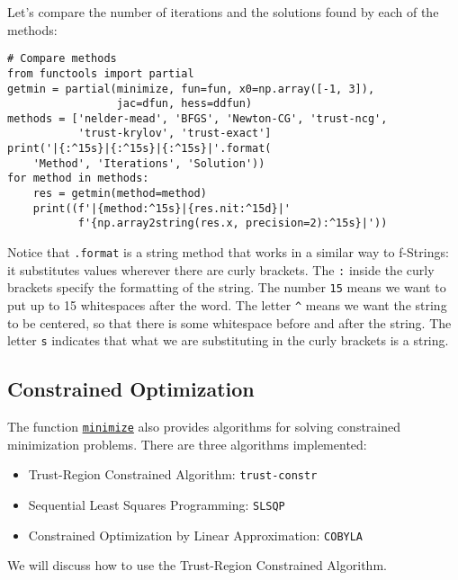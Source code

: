 \documentclass[12pt, a4paper]{article}
\begin{document}
Let's compare the number of iterations and the solutions found by each of the methods:
\lstset{language=jupyter-python,label= ,caption= ,captionpos=b,numbers=none}
\begin{lstlisting}
# Compare methods
from functools import partial
getmin = partial(minimize, fun=fun, x0=np.array([-1, 3]),
                 jac=dfun, hess=ddfun)
methods = ['nelder-mead', 'BFGS', 'Newton-CG', 'trust-ncg',
           'trust-krylov', 'trust-exact']
print('|{:^15s}|{:^15s}|{:^15s}|'.format(
    'Method', 'Iterations', 'Solution'))
for method in methods:
    res = getmin(method=method)
    print((f'|{method:^15s}|{res.nit:^15d}|'
           f'{np.array2string(res.x, precision=2):^15s}|'))
\end{lstlisting}
Notice that \texttt{.format} is a string method that works in a similar way to f-Strings: it substitutes values wherever there are curly brackets.
The \texttt{:} inside the curly brackets specify the formatting of the string.
The number \texttt{15} means we want to put up to 15 whitespaces after the word.
The letter \texttt{\textasciicircum{}} means we want the string to be centered, so that there is some whitespace before and after the string.
The letter \texttt{s} indicates that what we are substituting in the curly brackets is a string.
\subsection{Constrained Optimization}
\label{sec:org7897c23}
The function \href{https://docs.scipy.org/doc/scipy-1.3.0/reference/tutorial/optimize.html\#constrained-minimization-of-multivariate-scalar-functions-minimize}{\texttt{minimize}} also provides algorithms for solving constrained minimization problems.
There are three algorithms implemented:
\begin{itemize}
\item Trust-Region Constrained Algorithm: \texttt{trust-constr}
\item Sequential Least Squares Programming: \texttt{SLSQP}
\item Constrained Optimization by Linear Approximation: \texttt{COBYLA}
\end{itemize}
We will discuss how to use the Trust-Region Constrained Algorithm.
\end{document}
